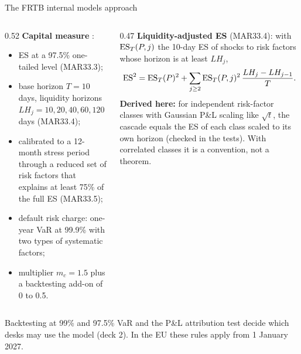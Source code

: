 \documentclass[aspectratio=169,10pt]{beamer}
\begin{document}
\begin{frame}{The FRTB internal models approach}
  \small
  \begin{columns}[T]
    \begin{column}{0.52\textwidth}
      \textbf{Capital measure} \citep{bcbs2023mar33}:
      \begin{itemize}
        \item ES at a 97.5\% one-tailed level (MAR33.3);
        \item base horizon $T = 10$ days, liquidity horizons $LH_j = 10, 20, 40, 60, 120$ days (MAR33.4);
        \item calibrated to a 12-month stress period through a reduced set of risk factors that explains at least 75\% of the full ES (MAR33.5);
        \item default risk charge: one-year VaR at 99.9\% with two types of systematic factors;
        \item multiplier $m_c = 1.5$ plus a backtesting add-on of 0 to 0.5.
      \end{itemize}
    \end{column}
    \begin{column}{0.47\textwidth}
      \textbf{Liquidity-adjusted ES} (MAR33.4): with $\mathrm{ES}_T(P,j)$ the 10-day ES of shocks to risk factors whose horizon is at least $LH_j$,
      \[ \mathrm{ES}^2 = \mathrm{ES}_T(P)^2 + \sum_{j\ge 2}\mathrm{ES}_T(P,j)^2\,\frac{LH_j - LH_{j-1}}{T}. \]
      \textbf{Derived here:} for independent risk-factor classes with Gaussian P\&L scaling like $\sqrt{t}$, the cascade equals the ES of each class scaled to its own horizon (checked in the tests). With correlated classes it is a convention, not a theorem.
    \end{column}
  \end{columns}
  \vspace{0.2em}
  \footnotesize Backtesting at 99\% and 97.5\% VaR and the P\&L attribution test decide which desks may use the model (deck 2). In the EU these rules apply from 1 January 2027.
\end{frame}
\end{document}
